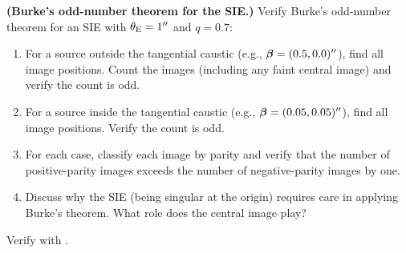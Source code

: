 \begin{exercise}
\label{ex:burke_verification}
\textbf{(Burke's odd-number theorem for the SIE.)}
Verify Burke's odd-number theorem for an SIE with $\theta_{\mathrm{E}} = 1''$
and $q = 0.7$:
\begin{enumerate}[label=(\alph*)]
    \item For a source outside the tangential caustic (e.g.,
          $\boldsymbol{\beta} = (0.5, 0.0)''$), find all image positions.
          Count the images (including any faint central image) and
          verify the count is odd.
    \item For a source inside the tangential caustic (e.g.,
          $\boldsymbol{\beta} = (0.05, 0.05)''$), find all image positions.
          Verify the count is odd.
    \item For each case, classify each image by parity and verify
          that the number of positive-parity images exceeds the
          number of negative-parity images by one.
    \item Discuss why the SIE (being singular at the origin)
          requires care in applying Burke's theorem.  What role does
          the central image play?
\end{enumerate}
Verify with
.
\end{exercise}
